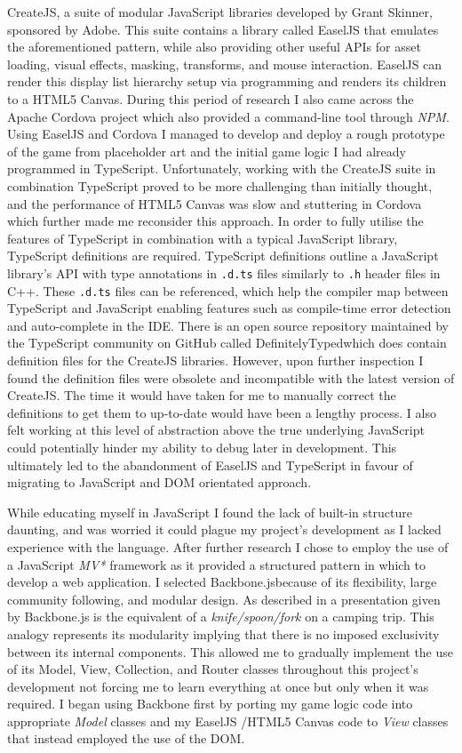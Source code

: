 \documentclass[final]{cmpreport}
\begin{document}
CreateJS, a suite of modular JavaScript libraries developed by Grant Skinner, sponsored by Adobe. This suite contains a library called EaselJS that emulates the aforementioned pattern, while also providing other useful APIs for asset loading, visual effects, masking, transforms, and mouse interaction. EaselJS can render this display list hierarchy setup via programming and renders its children to a HTML5 Canvas. During this period of research I also came across the Apache Cordova project which also provided a command-line tool through \textit{NPM}. Using EaselJS and Cordova I managed to develop and deploy a rough prototype of the game from placeholder art and the initial game logic I had already programmed in TypeScript. Unfortunately, working with the CreateJS suite in combination TypeScript proved to be more challenging than initially thought, and the performance of HTML5 Canvas was slow and stuttering in Cordova which further made me reconsider this approach. In order to fully utilise the features of TypeScript in combination with a typical JavaScript library, TypeScript definitions are required. TypeScript definitions outline a JavaScript library's API with type annotations in \texttt{.d.ts} files similarly to \texttt{.h} header files in C++. These \texttt{.d.ts} files can be referenced, which help the compiler map between TypeScript and JavaScript enabling features such as compile-time error detection and auto-complete in the IDE. There is an open source repository maintained by the TypeScript community on GitHub called DefinitelyTyped\footnotemark which does contain definition files for the CreateJS libraries. However, upon further inspection I found the definition files were obsolete and incompatible with the latest version of CreateJS. The time it would have taken for me to manually correct the definitions to get them to up-to-date would have been a lengthy process. I also felt working at this level of abstraction above the true underlying JavaScript could potentially hinder my ability to debug later in development. This ultimately led to the abandonment of EaselJS and TypeScript in favour of migrating to JavaScript and DOM orientated approach.

While educating myself in JavaScript I found the lack of built-in structure daunting, and was worried it could plague my project's development as I lacked experience with the language. After further research I chose to employ the use of a JavaScript \textit{MV* } framework as it provided a structured pattern in which to develop a web application. I selected Backbone.js\footnotemark because of its flexibility, large community following, and modular design. As described in a presentation given by \citet{Bull} Backbone.js is the equivalent of a \textit{knife/spoon/fork} on a camping trip. This analogy represents its modularity implying that there is no imposed exclusivity between its internal components. This allowed me to gradually implement the use of its Model, View, Collection, and Router classes throughout this project's development not forcing me to learn everything at once but only when it was required. I began using Backbone first by porting my game logic code into appropriate \textit{Model} classes and my EaselJS  /HTML5 Canvas code to \textit{View} classes that instead employed the use of the DOM.
\end{document}
